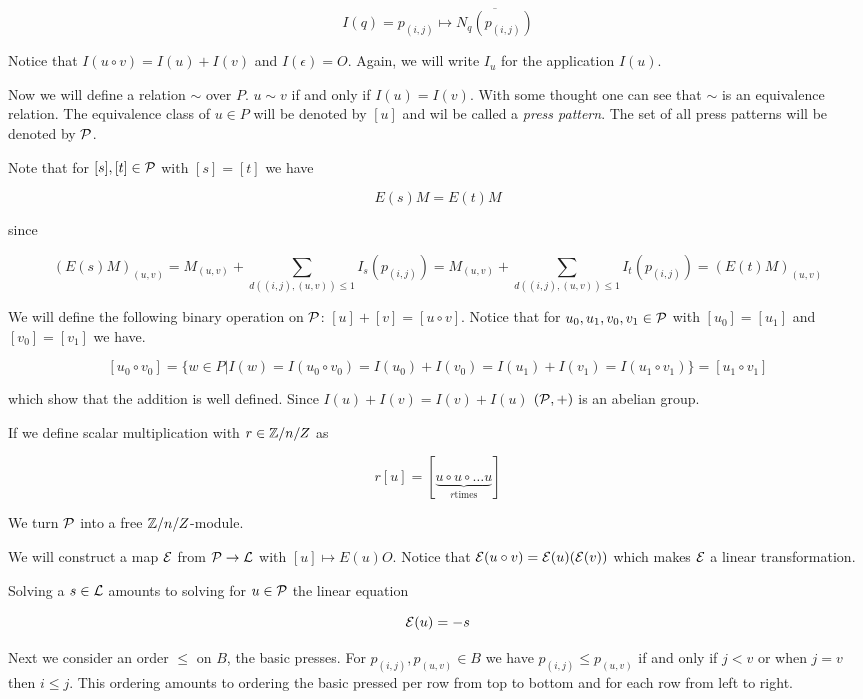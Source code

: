 \[
    I\left(q\right)
    =
    p_{(i,j)} \mapsto \overline{N_{q}(p_{(i,j)})}
\]

Notice that $I(u\circ v) = I(u) + I(v)$ and $I(\epsilon) = O$. Again, we will write $I_{u}$ for the application $I(u)$.

Now we will define a relation $\sim$ over $P$. $u \sim v$ if and only if $I(u) = I(v)$. With some thought one
can see that $\sim$ is an equivalence relation. The equivalence class of $u\in P$ will be denoted by $[u]$
and wil be called a \emph{press pattern}.
The set of all press patterns will be denoted by $\mathcal{P}$.

Note that for $[s],[t]\in\mathcal{P}$ with $[s]=[t]$ we have

\[
    E(s) M = E(t) M
\]

since 

\[
    \left(E(s) M\right)_{(u,v)}
    = M_{(u,v)} + \sum_{d((i,j),(u,v))\leq 1}I_{s}(p_{(i,j)})
    = M_{(u,v)} + \sum_{d((i,j),(u,v))\leq 1}I_{t}(p_{(i,j)})
    = \left(E(t) M\right)_{(u,v)}
 \]

We will define the following binary operation on $\mathcal{P}$: $[u] + [v] = [u\circ v]$. Notice that for
$u_{0}, u_{1}, v_{0}, v_{1}\in\mathcal{P}$ with $[u_{0}] = [u_{1}]$ and $[v_{0}] = [v_{1}]$ we have.

\[
    [u_{0}\circ v_{0}] =
    \{w\in P|
    I(w)=I(u_{0}\circ v_{0}) = I(u_{0})+I(v_{0}) = I(u_{1})+I(v_{1}) = I(u_{1}\circ v_{1})
    \} =
    [u_{1}\circ v_{1}]
\]

which show that the addition is well defined. Since $I(u) + I(v) = I(v) + I(u)$
$\left(\mathcal{P}, +\right)$ is an abelian group.

If we define scalar multiplication with $r\in\mathbb{Z}/n/Z$ as

\[
    r[u] = [\underbrace{u\circ u\circ\ldots u}_{r\text{times}}]
\]

We turn $\mathcal{P}$ into a free $\mathbb{Z}/n/Z$-module.

We will construct a map $\mathcal{E}$ from $\mathcal{P} \rightarrow \mathcal{L}$ with $[u] \mapsto E(u) O$. 
Notice that $\mathcal{E}(u\circ v) = \mathcal{E}(u)(\mathcal{E}(v))$ which makes $\mathcal{E}$ a linear transformation.

Solving a $s\in\mathcal{L}$ amounts to solving for $u\in\mathcal{P}$ the linear equation

\[
\mathcal{E}(u) = -s
\]

Next we consider an order $\leq$ on $B$, the basic presses. For $p_{(i,j)}, p_{(u,v)}\in B$
we have $p_{(i,j)}\leq p_{(u,v)}$ if and only if $j \lt v$ or when $j = v$ then $i \leq j$.
This ordering amounts to ordering the basic pressed per row from top to bottom and for each row
from left to right.

